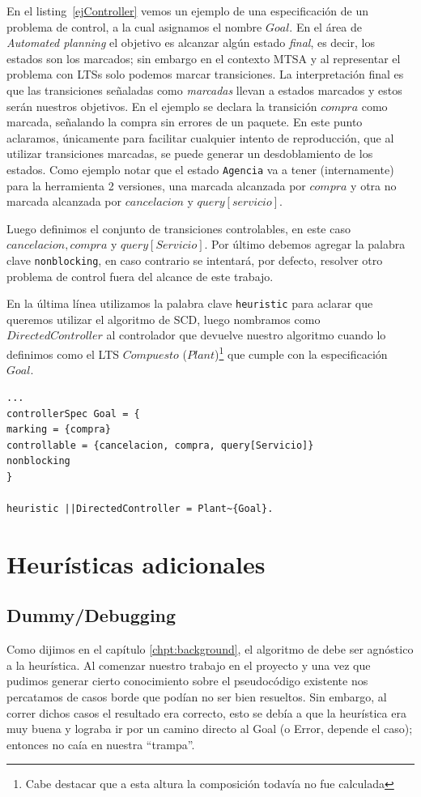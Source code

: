 En el listing~\ref{ejController} vemos un ejemplo de una especificación de un problema de control, a la cual asignamos el nombre $Goal$. En el área de \textit{Automated planning} el objetivo es alcanzar algún estado \textit{final}, es decir, los estados son los marcados; sin embargo en el contexto MTSA y al representar el problema con LTSs solo podemos marcar transiciones. La interpretación final es que las transiciones señaladas como \textit{marcadas} llevan a estados marcados y estos serán nuestros objetivos. En el ejemplo se declara la transición $compra$ como marcada, señalando la compra sin errores de un paquete. En este punto aclaramos, únicamente para facilitar cualquier intento de reproducción, que al utilizar transiciones marcadas, se puede generar un desdoblamiento de los estados. Como ejemplo notar que el estado \texttt{Agencia} va a tener (internamente) para la herramienta 2 versiones, una marcada alcanzada por $compra$ y otra no marcada alcanzada por $cancelacion$ y $query[servicio]$.

Luego definimos el conjunto de transiciones controlables, en este caso $cancelacion, compra$ y $ query[Servicio]$. Por último debemos agregar la palabra clave \texttt{nonblocking}, en caso contrario se intentará, por defecto, resolver otro problema de control fuera del alcance de este trabajo.

En la última línea utilizamos la palabra clave \texttt{heuristic} para aclarar que queremos utilizar el algoritmo de SCD, luego nombramos como $DirectedController$ al controlador que devuelve nuestro algoritmo cuando lo definimos como el LTS $Compuesto$ ($Plant$)\footnote{Cabe destacar que a esta altura la composición todavía no fue calculada} que cumple con la especificación $Goal$.

\begin{lstlisting}[language = mtsa, caption=Ejemplo de Controller y SCD, label=ejController]
...
controllerSpec Goal = {
marking = {compra}
controllable = {cancelacion, compra, query[Servicio]}
nonblocking
}

heuristic ||DirectedController = Plant~{Goal}.
\end{lstlisting}

\section{Heurísticas adicionales}\label{chpt:heurist-nuevas}
\subsection{Dummy/Debugging}
Como dijimos en el capítulo \ref{chpt:background}, el algoritmo de \DCS debe ser agnóstico a la heurística. Al comenzar nuestro trabajo en el proyecto y una vez que pudimos generar cierto conocimiento sobre el pseudocódigo existente nos percatamos de casos borde que podían no ser bien resueltos. Sin embargo, al correr dichos casos el resultado era correcto, esto se debía a que la heurística era muy buena y lograba ir por un camino directo al Goal (o Error, depende el caso); entonces no caía en nuestra ``trampa''.

